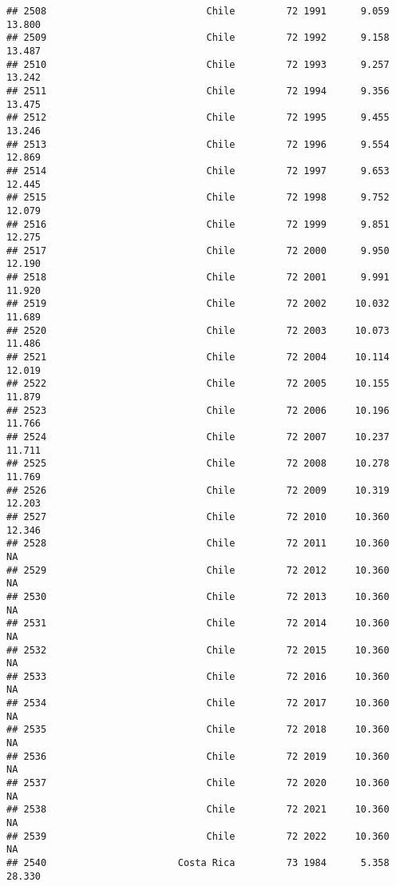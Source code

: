 \documentclass[
]{article}
\begin{document}
\begin{verbatim}
## 2508                            Chile         72 1991      9.059     13.800
## 2509                            Chile         72 1992      9.158     13.487
## 2510                            Chile         72 1993      9.257     13.242
## 2511                            Chile         72 1994      9.356     13.475
## 2512                            Chile         72 1995      9.455     13.246
## 2513                            Chile         72 1996      9.554     12.869
## 2514                            Chile         72 1997      9.653     12.445
## 2515                            Chile         72 1998      9.752     12.079
## 2516                            Chile         72 1999      9.851     12.275
## 2517                            Chile         72 2000      9.950     12.190
## 2518                            Chile         72 2001      9.991     11.920
## 2519                            Chile         72 2002     10.032     11.689
## 2520                            Chile         72 2003     10.073     11.486
## 2521                            Chile         72 2004     10.114     12.019
## 2522                            Chile         72 2005     10.155     11.879
## 2523                            Chile         72 2006     10.196     11.766
## 2524                            Chile         72 2007     10.237     11.711
## 2525                            Chile         72 2008     10.278     11.769
## 2526                            Chile         72 2009     10.319     12.203
## 2527                            Chile         72 2010     10.360     12.346
## 2528                            Chile         72 2011     10.360         NA
## 2529                            Chile         72 2012     10.360         NA
## 2530                            Chile         72 2013     10.360         NA
## 2531                            Chile         72 2014     10.360         NA
## 2532                            Chile         72 2015     10.360         NA
## 2533                            Chile         72 2016     10.360         NA
## 2534                            Chile         72 2017     10.360         NA
## 2535                            Chile         72 2018     10.360         NA
## 2536                            Chile         72 2019     10.360         NA
## 2537                            Chile         72 2020     10.360         NA
## 2538                            Chile         72 2021     10.360         NA
## 2539                            Chile         72 2022     10.360         NA
## 2540                       Costa Rica         73 1984      5.358     28.330

\end{verbatim}
\end{document}
